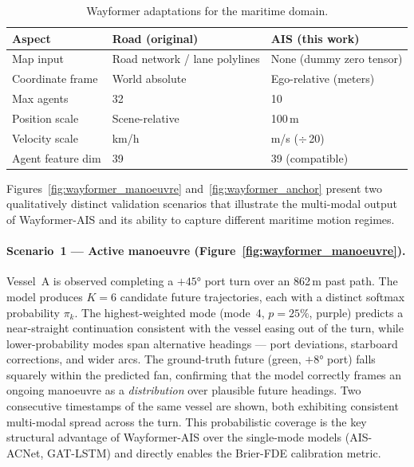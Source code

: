 \documentclass[12pt, a4paper]{article}
\begin{document}
\begin{table}[H]
    \centering
    \caption{Wayformer adaptations for the maritime domain.}
    \label{tab:adaptation}
    \begin{tabular}{lll}
        \toprule
        \textbf{Aspect} & \textbf{Road (original)} & \textbf{AIS (this work)} \\
        \midrule
        Map input         & Road network / lane polylines & None (dummy zero tensor) \\
        Coordinate frame  & World absolute               & Ego-relative (meters) \\
        Max agents        & 32                           & 10 \\
        Position scale    & Scene-relative               & 100\,m \\
        Velocity scale    & km/h                         & m/s ($\div$\,20) \\
        Agent feature dim & 39                           & 39 (compatible) \\
        \bottomrule
    \end{tabular}
\end{table}

  Figures~\ref{fig:wayformer_manoeuvre} and~\ref{fig:wayformer_anchor} present two
  qualitatively distinct validation scenarios that illustrate the multi-modal output
  of Wayformer-AIS and its ability to capture different maritime motion regimes.

  \paragraph{Scenario~1 — Active manoeuvre (Figure~\ref{fig:wayformer_manoeuvre}).}
  Vessel~A is observed completing a $+45°$ port turn over an
  862\,m past path.  The model produces $K=6$ candidate future trajectories, each
  with a distinct softmax probability $\pi_k$.  The highest-weighted mode (mode~4,
  $p=25\%$, purple) predicts a near-straight continuation consistent with the vessel
  easing out of the turn, while lower-probability modes span alternative headings —
  port deviations, starboard corrections, and wider arcs.  The ground-truth future
  (green, $+8°$ port) falls squarely within the predicted fan, confirming that the
  model correctly frames an ongoing manoeuvre as a \emph{distribution} over plausible
  future headings.  Two consecutive timestamps of the same vessel are shown, both
  exhibiting consistent multi-modal spread across the turn.  This probabilistic
  coverage is the key structural advantage of Wayformer-AIS over the single-mode
  models (AIS-ACNet, GAT-LSTM) and directly enables the Brier-FDE calibration metric.
\end{document}
